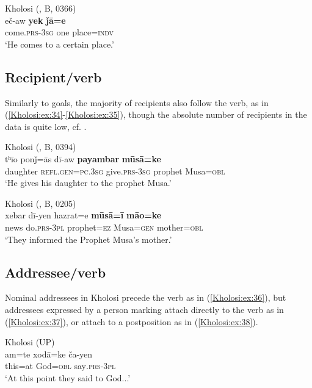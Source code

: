 \documentclass[output=paper,colorlinks,citecolor=brown]{langscibook}
\begin{document}
\ea\label{Kholosi:ex:33}
Kholosi (\citealt{nourzaei_kholosi_2022}, B, 0366)\\
\gll eč-aw \textbf{yek} \textbf{ǰā=e} \\
come\textsc{.prs-3sg} one place\textsc{=indv} \\
\glt `He comes to a certain place.'
\z

\subsection{Recipient/verb}\label{Kholosi:ss:4.4}

Similarly to goals, the majority of recipients also follow the verb, as in (\ref{Kholosi:ex:34}-\ref{Kholosi:ex:35}), though the absolute number of recipients in the data is quite low, cf. .

\ea\label{Kholosi:ex:34}
Kholosi (\citealt{nourzaei_kholosi_2022}, B, 0394)\\
\gll tʰīo ponǰ=ās dī-aw \textbf{payambar} \textbf{mūsā=ke} \\
daughter \textsc{refl.gen=pc.3sg} give\textsc{.prs-3sg} prophet Musa\textsc{=obl} \\
\glt `He gives his daughter to the prophet Musa.' 
\z

\ea\label{Kholosi:ex:35}
Kholosi (\citealt{nourzaei_kholosi_2022}, B, 0205)\\
\gll xebar dī-yen hazrat=e \textbf{mūsā=ī} \textbf{māo=ke} \\
news do\textsc{.prs-3pl} prophet\textsc{=ez} Musa\textsc{=gen} mother\textsc{=obl} \\
\glt `They informed the Prophet Musa's mother.'
\z

\subsection{Addressee/verb}\label{Kholosi:ss:4.5}

Nominal addressees in Kholosi precede the verb as in (\ref{Kholosi:ex:36}), but addressees expressed by a person marking  attach directly to the verb as in (\ref{Kholosi:ex:37}), or attach to a postposition as in (\ref{Kholosi:ex:38}).

\ea\label{Kholosi:ex:36}
Kholosi (UP)\\
\gll am=te xodā=ke ča-yen \\
this=at God\textsc{=obl} say\textsc{.prs-3pl} \\
\glt `At this point they said to God...' 
\z
\end{document}
